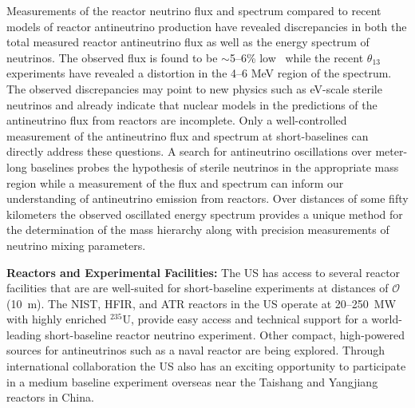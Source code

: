 Measurements of the reactor neutrino flux and spectrum compared to
recent models of reactor antineutrino production have revealed
discrepancies in both the total measured reactor antineutrino flux as
well as the energy spectrum of neutrinos. The observed flux is found
to be $\sim$5--6\% low~\cite{Mention:2011rk, Zhang:2013ela} while the
recent $\theta_{13}$ experiments have revealed a distortion in the 4--6
MeV region of the spectrum.  The observed discrepancies may point to
new physics such as eV-scale sterile neutrinos and already indicate
that nuclear models in the predictions of the antineutrino flux from
reactors are incomplete.  Only a well-controlled measurement of the
antineutrino flux and spectrum at short-baselines can directly address
these questions. A search for antineutrino oscillations over
meter-long baselines probes the hypothesis of sterile neutrinos in the
appropriate mass region while a measurement of the flux and spectrum
can inform our understanding of antineutrino emission from reactors.
Over distances of some fifty kilometers the observed oscillated energy
spectrum provides a unique method for the determination of the mass
hierarchy along with precision measurements of neutrino mixing
parameters.

{\bf Reactors and Experimental Facilities:}
The US has access to several reactor facilities that are are
well-suited for short-baseline experiments at distances of
$\mathcal{O}$(10~m). The NIST, HFIR, and ATR reactors in the US
operate at 20--250~MW with highly enriched $^{235}$U, provide easy
access and technical support for a world-leading short-baseline
reactor neutrino experiment. Other compact, high-powered sources for
antineutrinos such as a naval reactor are being explored. Through
international collaboration the US also has an exciting opportunity to
participate in a medium baseline experiment overseas near the Taishang
and Yangjiang reactors in China.


